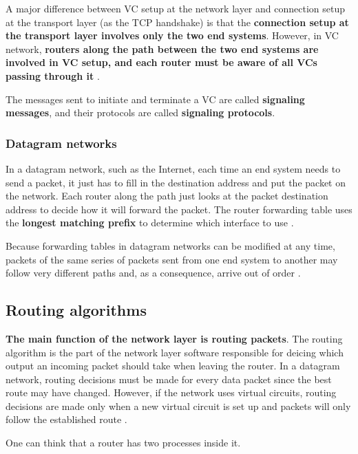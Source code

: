 A major difference between VC setup at the network layer and connection setup at the transport layer (as the TCP handshake) is that the \textbf{connection setup at the transport layer involves only the two end systems}. However, in VC network, \textbf{routers along the path between the two end systems are involved in VC setup, and each router must be aware of all VCs passing through it} \cite[p.~316]{computer-networking-kurose-2012}.

The messages sent to initiate and terminate a VC are called \textbf{signaling messages}, and their protocols are called \textbf{signaling protocols}.

\subsubsection{Datagram networks}

In a datagram network, such as the Internet, each time an end system needs to send a packet, it just has to fill in the destination address and put the packet on the network.
Each router along the path just looks at the packet destination address to decide how it will forward the packet.
The router forwarding table uses the \textbf{longest matching prefix} to determine which interface to use \cite[p.~318]{computer-networking-kurose-2012}.

Because forwarding tables in datagram networks can be modified at any time, packets of the same series of packets sent from one end system to another may follow very different paths and, as a consequence, arrive out of order \cite[p.~319]{computer-networking-kurose-2012}.

\subsection{Routing algorithms}

\textbf{The main function of the network layer is routing packets}.
The routing algorithm is the part of the network layer software responsible for deicing which output an incoming packet should take when leaving the router.
In a datagram network, routing decisions must be made for every data packet since the best route may have changed.
However, if the network uses virtual circuits, routing decisions are made only when a new virtual circuit is set up and packets will only follow the established route \cite[p.~362]{computer-networks-tanenbaum-2012}.

One can think that a router has two processes inside it.

